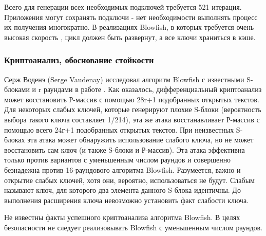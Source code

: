 Всего для генерации всех необходимых подключей требуется 521 
итерация. Приложения могут сохранять подключи - нет необходимости 
выполнять процесс их получения многократно.
В реализациях Blowfish, в которых требуется очень высокая скорость
, цикл должен быть развернут, а все ключи храниться в кэше.

\subsubsection{Криптоанализ, обоснование стойкости}
Серж Воденэ (Serge Vaudenay) исследовал алгоритм Blowfish с известными 
S-блоками и r раундами в работе \cite{vaudenay-blowfish}. Как оказалось, 
дифференциальный криптоанализ 
может восстановить Р-массив с помощью 28r+1 подобранных открытых 
текстов. Для некоторых слабых ключей, которые генерируют плохие 
S-блоки (вероятность выбора такого ключа составляет 1/214), эта 
же атака восстанавливает Р-массив с помощью всего 24г+1 подобранных 
открытых текстов. При неизвестных S-блоках эта атака может обнаружить 
использование слабого ключа, но не может восстановить сам ключ 
(и также S-блоки и Р-массив). Эта атака эффективна только против 
вариантов с уменьшенным числом раундов и совершенно безнадежна 
против 16-раундового алгоритма Blowfish. Разумеется, важно и 
открытие слабых ключей, хотя они, вероятно, использоваться не 
будут. Слабым называют ключ, для которого два элемента данного 
S-блока идентичны. До выполнения расширения ключа невозможно 
установить факт слабости ключа. 

Не известны факты успешного криптоанализа алгоритма Blowfish. 
В целях безопасности не следует реализовывать Blowfish с уменьшенным 
числом раундов.

